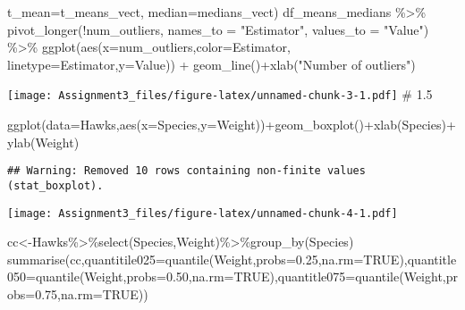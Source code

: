 \documentclass[
]{article}
\newenvironment{Shaded}{\begin{snugshade}}{\end{snugshade}}
\newcommand{\AttributeTok}[1]{\textcolor[rgb]{0.77,0.63,0.00}{#1}}
\newcommand{\ConstantTok}[1]{\textcolor[rgb]{0.00,0.00,0.00}{#1}}
\newcommand{\FloatTok}[1]{\textcolor[rgb]{0.00,0.00,0.81}{#1}}
\newcommand{\FunctionTok}[1]{\textcolor[rgb]{0.00,0.00,0.00}{#1}}
\newcommand{\NormalTok}[1]{#1}
\newcommand{\OtherTok}[1]{\textcolor[rgb]{0.56,0.35,0.01}{#1}}
\newcommand{\SpecialCharTok}[1]{\textcolor[rgb]{0.00,0.00,0.00}{#1}}
\newcommand{\StringTok}[1]{\textcolor[rgb]{0.31,0.60,0.02}{#1}}
\begin{document}
\begin{Shaded}
\begin{Highlighting}[]
\AttributeTok{t\_mean=}\NormalTok{t\_means\_vect, }\AttributeTok{median=}\NormalTok{medians\_vect)}
\NormalTok{df\_means\_medians }\SpecialCharTok{\%\textgreater{}\%}
\FunctionTok{pivot\_longer}\NormalTok{(}\SpecialCharTok{!}\NormalTok{num\_outliers, }\AttributeTok{names\_to =} \StringTok{"Estimator"}\NormalTok{, }\AttributeTok{values\_to =} \StringTok{"Value"}\NormalTok{) }\SpecialCharTok{\%\textgreater{}\%}
\FunctionTok{ggplot}\NormalTok{(}\FunctionTok{aes}\NormalTok{(}\AttributeTok{x=}\NormalTok{num\_outliers,}\AttributeTok{color=}\NormalTok{Estimator, }\AttributeTok{linetype=}\NormalTok{Estimator,}\AttributeTok{y=}\NormalTok{Value)) }\SpecialCharTok{+}
\FunctionTok{geom\_line}\NormalTok{()}\SpecialCharTok{+}\FunctionTok{xlab}\NormalTok{(}\StringTok{"Number of outliers"}\NormalTok{)}
\end{Highlighting}
\end{Shaded}

\texttt{[image: Assignment3\_files/figure-latex/unnamed-chunk-3-1.pdf]}
\# 1.5

\begin{Shaded}
\begin{Highlighting}[]
\FunctionTok{ggplot}\NormalTok{(}\AttributeTok{data=}\NormalTok{Hawks,}\FunctionTok{aes}\NormalTok{(}\AttributeTok{x=}\NormalTok{Species,}\AttributeTok{y=}\NormalTok{Weight))}\SpecialCharTok{+}\FunctionTok{geom\_boxplot}\NormalTok{()}\SpecialCharTok{+}\FunctionTok{xlab}\NormalTok{(}\StringTok{\textquotesingle{}Species\textquotesingle{}}\NormalTok{)}\SpecialCharTok{+}\FunctionTok{ylab}\NormalTok{(}\StringTok{\textquotesingle{}Weight\textquotesingle{}}\NormalTok{)}
\end{Highlighting}
\end{Shaded}

\begin{verbatim}
## Warning: Removed 10 rows containing non-finite values (stat_boxplot).
\end{verbatim}

\texttt{[image: Assignment3\_files/figure-latex/unnamed-chunk-4-1.pdf]}

\begin{Shaded}
\begin{Highlighting}[]
\NormalTok{cc}\OtherTok{\textless{}{-}}\NormalTok{Hawks}\SpecialCharTok{\%\textgreater{}\%}\FunctionTok{select}\NormalTok{(Species,Weight)}\SpecialCharTok{\%\textgreater{}\%}\FunctionTok{group\_by}\NormalTok{(Species)}
\FunctionTok{summarise}\NormalTok{(cc,}\AttributeTok{quantitile025=}\FunctionTok{quantile}\NormalTok{(Weight,}\AttributeTok{probs=}\FloatTok{0.25}\NormalTok{,}\AttributeTok{na.rm=}\ConstantTok{TRUE}\NormalTok{),}\AttributeTok{quantitle050=}\FunctionTok{quantile}\NormalTok{(Weight,}\AttributeTok{probs=}\FloatTok{0.50}\NormalTok{,}\AttributeTok{na.rm=}\ConstantTok{TRUE}\NormalTok{),}\AttributeTok{quantitle075=}\FunctionTok{quantile}\NormalTok{(Weight,}\AttributeTok{probs=}\FloatTok{0.75}\NormalTok{,}\AttributeTok{na.rm=}\ConstantTok{TRUE}\NormalTok{))}
\end{Highlighting}
\end{Shaded}
\end{document}
